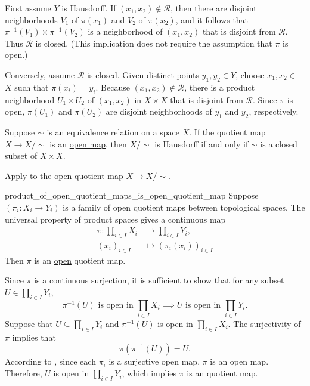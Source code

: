 \documentclass{report}
\begin{document}
\begin{prf}
	First assume $Y$ is Hausdorff. If $\left(x_1, x_2\right) \notin \mathcal{R}$, then there are disjoint neighborhoods $V_1$ of $\pi\left(x_1\right)$ and $V_2$ of $\pi\left(x_2\right)$, and it follows that $\pi^{-1}\left(V_1\right) \times \pi^{-1}\left(V_2\right)$ is a neighborhood of $\left(x_1, x_2\right)$ that is disjoint from $\mathcal{R}$. Thus $\mathcal{R}$ is closed. (This implication does not require the assumption that $\pi$ is open.)

	Conversely, assume $\mathcal{R}$ is closed. Given distinct points $y_1, y_2 \in Y$, choose $x_1, x_2 \in$ $X$ such that $\pi\left(x_i\right)=y_i$. Because $\left(x_1, x_2\right) \notin \mathcal{R}$, there is a product neighborhood $U_1 \times U_2$ of $\left(x_1, x_2\right)$ in $X \times X$ that is disjoint from $\mathcal{R}$. Since $\pi$ is open, $\pi\left(U_1\right)$ and $\pi\left(U_2\right)$ are disjoint neighborhoods of $y_1$ and $y_2$, respectively.
\end{prf}

\begin{corollary}{}{}
	Suppose $\sim$ is an equivalence relation on a space $X$. If the quotient map $X \rightarrow X / \sim$ is an \hyperref[th:open_map]{open map}, then $X / \sim$ is Hausdorff if and only if $\sim$ is a closed subset of $X \times X$.
\end{corollary}
\begin{prf}
	Apply  to the open quotient map $X \rightarrow X / \sim$.
\end{prf}

\begin{proposition}{}{product_of_open_quotient_maps_is_open_quotient_map}
	Suppose $(\pi_i:X_i \to Y_i)$ is a family of open quotient maps between topological spaces. The universal property of product spaces gives a continuous map
	\begin{align*}
		\pi: \prod_{i \in I} X_i & \longrightarrow \prod_{i \in I} Y_i, \\
		(x_i)_{i \in I}          & \longmapsto (\pi_i(x_i))_{i \in I}
	\end{align*}
	Then $\pi$ is an \hyperref[th:open_map]{open} quotient map.
\end{proposition}
\begin{prf}
	Since $\pi$ is a continuous surjection, it is sufficient to show that for any subset $U\in \prod_{i \in I} Y_i$,
	\[
		\pi^{-1}(U)\text{ is open in }\prod_{i \in I} X_i \implies U\text{ is open in }\prod_{i \in I} Y_i.
	\]
	Suppose that $U\subseteq \prod_{i \in I} Y_i$ and $\pi^{-1}(U)$ is open in $\prod_{i \in I} X_i$. The surjectivity of $\pi$ implies that
	\[
	\pi(\pi^{-1}(U))=U.
	\]
	According to , since each $\pi_i$ is a surjective open map, $\pi$ is an open map. Therefore, $U$ is open in $\prod_{i \in I} Y_i$, which implies $\pi$ is an quotient map.

\end{prf}
\end{document}
